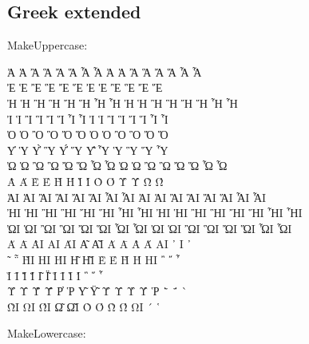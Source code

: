 \documentclass[a4paper]{scrartcl}
\begin{document}
\subsection{Greek extended}

MakeUppercase:


\MakeUppercase{ ἀ ἁ ἂ ἃ ἄ ἅ ἆ ἇ Ἀ Ἁ Ἂ Ἃ Ἄ Ἅ Ἆ Ἇ }\\
\MakeUppercase{ ἐ ἑ ἒ ἓ ἔ ἕ     Ἐ Ἑ Ἒ Ἓ Ἔ Ἕ     }\\
\MakeUppercase{ ἠ ἡ ἢ ἣ ἤ ἥ ἦ ἧ Ἠ Ἡ Ἢ Ἣ Ἤ Ἥ Ἦ Ἧ }\\
\MakeUppercase{ ἰ ἱ ἲ ἳ ἴ ἵ ἶ ἷ Ἰ Ἱ Ἲ Ἳ Ἴ Ἵ Ἶ Ἷ }\\
\MakeUppercase{ ὀ ὁ ὂ ὃ ὄ ὅ     Ὀ Ὁ Ὂ Ὃ Ὄ Ὅ     }\\
\MakeUppercase{ ὐ ὑ ὒ ὓ ὔ ὕ ὖ ὗ   Ὑ   Ὓ   Ὕ   Ὗ }\\
\MakeUppercase{ ὠ ὡ ὢ ὣ ὤ ὥ ὦ ὧ Ὠ Ὡ Ὢ Ὣ Ὤ Ὥ Ὦ Ὧ }\\
\MakeUppercase{ ὰ ά ὲ έ ὴ ή ὶ ί ὸ ό ὺ ύ ὼ ώ     }\\
\MakeUppercase{ ᾀ ᾁ ᾂ ᾃ ᾄ ᾅ ᾆ ᾇ ᾈ ᾉ ᾊ ᾋ ᾌ ᾍ ᾎ ᾏ }\\
\MakeUppercase{ ᾐ ᾑ ᾒ ᾓ ᾔ ᾕ ᾖ ᾗ ᾘ ᾙ ᾚ ᾛ ᾜ ᾝ ᾞ ᾟ }\\
\MakeUppercase{ ᾠ ᾡ ᾢ ᾣ ᾤ ᾥ ᾦ ᾧ ᾨ ᾩ ᾪ ᾫ ᾬ ᾭ ᾮ ᾯ }\\
\MakeUppercase{ ᾰ ᾱ ᾲ ᾳ ᾴ   ᾶ ᾷ Ᾰ Ᾱ Ὰ Ά ᾼ ᾽ ι ᾿ }\\
\MakeUppercase{ ῀ ῁ ῂ ῃ ῄ   ῆ ῇ Ὲ Έ Ὴ Ή ῌ ῍ ῎ ῏ }\\
\MakeUppercase{ ῐ ῑ ῒ ΐ     ῖ ῗ Ῐ Ῑ Ὶ Ί   ῝ ῞ ῟ }\\
\MakeUppercase{ ῠ ῡ ῢ ΰ ῤ ῥ ῦ ῧ Ῠ Ῡ Ὺ Ύ Ῥ ῭ ΅ ` }\\
\MakeUppercase{     ῲ ῳ ῴ   ῶ ῷ Ὸ Ό Ὼ Ώ ῼ ´ ῾   }

MakeLowercase:
\end{document}

